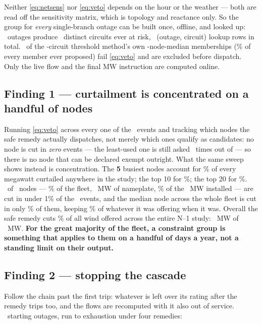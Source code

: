 \documentclass[11pt,a4paper]{article}
\begin{document}
Neither \eqref{eq:netsens} nor \eqref{eq:veto} depends on the hour or the
weather --- both are read off the sensitivity matrix, which is topology and
reactance only. So the group for \emph{every} single-branch outage can be
built once, offline, and looked up: \pTripsOutages\ outages produce
\pTripsCircuits\ distinct circuits ever at risk, \pTrips\ (outage, circuit)
lookup rows in total. \pVetoedFromEir\ of the \pTripsCircuits-circuit
threshold method's own \pEirMedNodes-node-median memberships
(\pVetoedFromEirPct\% of every member ever proposed) fail \eqref{eq:veto} and
are excluded before dispatch. Only the live flow and the final MW instruction
are computed online.

\subsection*{Finding 1 --- curtailment is concentrated on a handful of nodes}

Running \eqref{eq:veto} across every one of the \pN\ events and tracking which
nodes the safe remedy actually dispatches, not merely which ones qualify as
candidates: no node is cut in \emph{zero} events --- the least-used one is
still asked \pMinCutEvents\ times out of \pN --- so there is no node that can
be declared exempt outright. What the same sweep shows instead is
concentration. The \textbf{5} busiest nodes account for \pTopFivePct\% of every
megawatt curtailed anywhere in the study; the top 10 for \pTopTenPct\%; the top
20 for \pTopTwentyPct\%. \pRareN\ of \pWindN\ nodes --- \pRarePct\% of the fleet,
\pRareMW\ MW of nameplate, \pRareFleetPct\% of the \pWindFleetMW\ MW installed
--- are cut in under 1\% of the \pN\ events, and the median node across the
whole fleet is cut in only \pMedEventsPct\% of them, keeping \pMedKeptPct\% of
whatever it was offering when it was. Overall the safe remedy cuts
\pOverallCutPct\% of all wind offered across the entire N--1 study:
\pTotalCutMW\ MW of \pTotalOfferedMW\ MW. \textbf{For the great majority of
the fleet, a constraint group is something that applies to them on a handful
of days a year, not a standing limit on their output.}

\subsection*{Finding 2 --- stopping the cascade}

Follow the chain past the first trip: whatever is left over its rating after
the remedy trips too, and the flows are recomputed with it also out of
service. \pCascN\ starting outages, run to exhaustion under four remedies:
\end{document}
